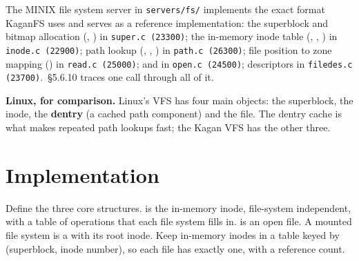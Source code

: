 \documentclass[11pt,a4paper]{article}
\begin{document}
\begin{minixbox}
The MINIX file system server in \texttt{servers/fs/} implements the exact format KaganFS uses and serves as a reference implementation: the superblock and bitmap allocation (, ) in \texttt{super.c (23300)}; the
in-memory inode table (, , ) in \texttt{inode.c (22900)}; path
lookup (, , ) in \texttt{path.c (26300)}; file position to zone
mapping () in \texttt{read.c (25000)};  and  in \texttt{open.c (24500)};
descriptors in \texttt{filedes.c (23700)}. \OSDI\,\S5.6.10 traces one  call through all of it.

\par\smallskip\textbf{Linux, for comparison.} \LKD Linux's VFS has four main objects: the superblock, the inode, the \textbf{dentry} (a cached path component) and the file. The dentry cache is what makes repeated path lookups fast; the Kagan VFS has the other three.
\end{minixbox}

\section{Implementation}

Define the three core structures.  is the in-memory inode, file-system independent, with a table
of operations that each file system fills in.  is an open file. A mounted file system is a
 with its root inode. Keep in-memory inodes in a table keyed by (superblock, inode number), so
each file has exactly one, with a reference count.
\end{document}
